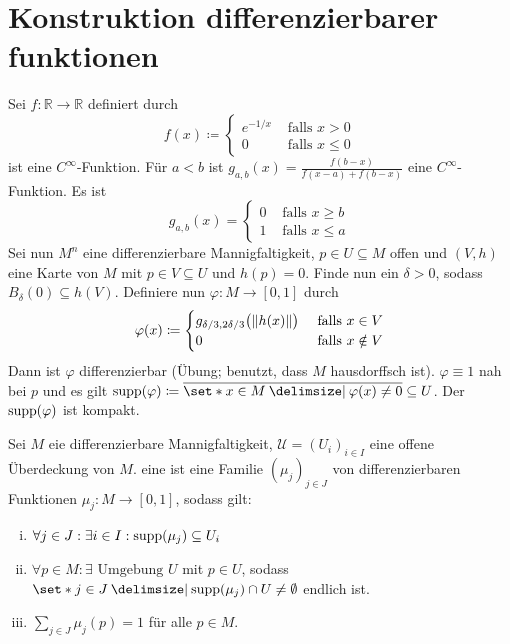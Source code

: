 \section*{Konstruktion differenzierbarer funktionen} %
\label{sec:konstruktion_differenzierbarer_funktionen}
\begin{bemerkung}
	Sei $f \colon \mathbb{R}\to \mathbb{R}$ definiert durch 
	\[
		f(x) \coloneqq \begin{cases}
			e^{-1/x} &\text{ falls }x>0\\
			0 &\text{ falls } x \le 0
		\end{cases}
	\]
	ist eine $C^\infty$-Funktion.
	Für $a < b$ ist $g_{a,b}(x) = \frac{f(b-x)}{f(x-a) + f(b-x)}$ eine $C^\infty$-Funktion.
	Es ist 
	\[
		g_{a,b}(x)= \begin{cases}
			0 &\text{ falls }x \ge b\\
			1 &\text{ falls } x \le a
		\end{cases}
	\]
	Sei nun $M^n$ eine differenzierbare Mannigfaltigkeit, $p \in U \subseteq M$ offen und $(V,h)$ eine Karte von $M$ mit $p \in V \subseteq U$ und $h(p)=0$.
	Finde nun ein $\delta >0$, sodass $B_\delta(0) \subseteq h(V)$.
	Definiere nun $\varphi \colon M \to [0,1]$ durch
	\[
		\varphi(x) \coloneqq \begin{cases}
			g_{\delta/3,2\delta/3} \enbrace[\big]{\norm*{h(x)}} &\text{ falls }x \in V\\
			0 &\text{ falls } x \notin V
		\end{cases}
	\]
	Dann ist $\varphi$ differenzierbar (Übung; benutzt, dass $M$ hausdorffsch ist).
	$\varphi \equiv 1$ nah bei $p$ und es gilt $\supp(\varphi) \coloneqq \overline{\set*{x \in M \given \varphi(x)\neq 0}} \subseteq U$.
	Der  $\supp(\varphi)$ ist kompakt.
\end{bemerkung}

\begin{definition}
	Sei $M$ eie differenzierbare Mannigfaltigkeit, $\mathcal{U} = (U_i)_{i \in I}$ eine offene Überdeckung von $M$.
	eine  ist eine Familie $(\mu_j)_{j \in J}$ von differenzierbaren Funktionen $\mu_j \colon M \to [0,1]$, sodass gilt:
	\begin{enumerate}[(i)]
		\item $\forall j \in J : \exists i \in I : \supp(\mu_j) \subseteq U_i$
		\item $\forall p \in M : \exists \text{ Umgebung } U$ mit $p \in U$, sodass $\set*{j \in J \given \supp(\mu_j) \cap U \neq \emptyset}$ endlich ist.
		\item $\sum_{j \in J} \mu_j(p) = 1$ für alle $p \in M$.
	\end{enumerate}
\end{definition}

